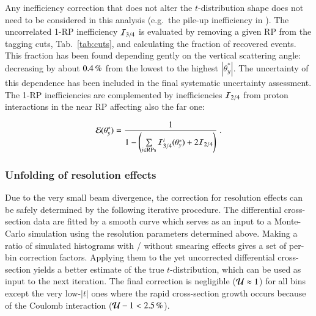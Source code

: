Any inefficiency correction that does not alter the $t$-distribution shape does not need to be considered in this analysis (e.g.~the pile-up inefficiency in \cite{prl111}). The uncorrelated 1-RP inefficiency ${\cal I}_{3/4}$ is evaluated by removing a given RP from the tagging cuts, Tab.~\ref{tab:cuts}, and calculating the fraction of recovered events. This fraction has been found depending gently on the vertical scattering angle: decreasing by about $0.4\,{\rm \%}$ from the lowest to the highest $|\theta_y^*|$. The uncertainty of this dependence has been included in the final systematic uncertainty assessment. The 1-RP inefficiencies are complemented by inefficiencies ${\cal I}_{2/4}$ from proton interactions in the near RP affecting also the far one:

\begin{equation}
\label{efficiency}
	{\cal E}(\theta_y^*) = {1\over 1 - \left( \sum\limits_{i\in \rm RPs} {\cal I}^i_{3/4}(\theta_y^*) + 2 {\cal I}_{2/4} \right) } \ .
\end{equation}

\subsubsection{Unfolding of resolution effects}

Due to the very small beam divergence, the correction for resolution effects can be safely determined by the following iterative procedure. The differential cross-section data are fitted by a smooth curve which serves as an input to a Monte-Carlo simulation using the resolution parameters determined above. Making a ratio of simulated histograms with / without smearing effects gives a set of per-bin correction factors. Applying them to the yet uncorrected differential cross-section yields a better estimate of the true $t$-distribution, which can be used as input to the next iteration. The final correction is negligible (${\cal U} \approx 1$) for all bins except the very low-$|t|$ ones where the rapid cross-section growth occurs because of the Coulomb interaction ($ {\cal U} - 1 < 2.5\un{\%}$).

